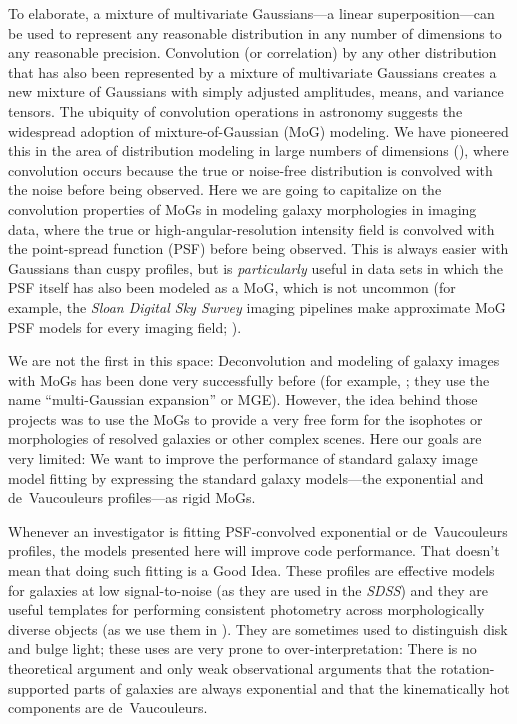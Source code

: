 \documentclass[12pt,pdftex,preprint]{aastex}
\newcommand{\project}[1]{\textsl{#1}}
\begin{document}
To elaborate, a mixture of multivariate Gaussians---a linear
superposition---can be used to represent any reasonable distribution
in any number of dimensions to any reasonable precision.  Convolution
(or correlation) by any other distribution that has also been
represented by a mixture of multivariate Gaussians creates a new
mixture of Gaussians with simply adjusted amplitudes, means, and
variance tensors.  The ubiquity of convolution operations in astronomy
suggests the widespread adoption of mixture-of-Gaussian (MoG)
modeling.  We have pioneered this in the area of distribution modeling
in large numbers of dimensions (\citealt{xd, xdqso, xdqsoz}), where
convolution occurs because the true or noise-free distribution is
convolved with the noise before being observed.  Here we are going to
capitalize on the convolution properties of MoGs in modeling galaxy
morphologies in imaging data, where the true or
high-angular-resolution intensity field is convolved with the
point-spread function (PSF) before being observed.  This is always
easier with Gaussians than cuspy profiles, but is \emph{particularly}
useful in data sets in which the PSF itself has also been modeled as a
MoG, which is not uncommon (for example, the \project{Sloan Digital
  Sky Survey} imaging pipelines make approximate MoG PSF models for
every imaging field; \citealt{lupton}).

We are not the first in this space: Deconvolution and modeling of
galaxy images with MoGs has been done very successfully before (for
example, \citealt{bendinelli, emsellem, bendinelli2, cappellari}; they
use the name ``multi-Gaussian expansion'' or MGE).  However, the idea
behind those projects was to use the MoGs to provide a very free form
for the isophotes or morphologies of resolved galaxies or other
complex scenes.  Here our goals are very limited: We want to improve
the performance of standard galaxy image model fitting by expressing
the standard galaxy models---the exponential and de~Vaucouleurs
profiles---as rigid MoGs.

Whenever an investigator is fitting PSF-convolved exponential or
de~Vaucouleurs profiles, the models presented here will improve code
performance.  That doesn't mean that doing such fitting is a Good
Idea.  These profiles are effective models for galaxies at low
signal-to-noise (as they are used in the \project{SDSS}) and they are
useful templates for performing consistent photometry across
morphologically diverse objects (as we use them in \citealt{bundy}).
They are sometimes used to distinguish disk and bulge light; these
uses are very prone to over-interpretation: There is no theoretical
argument and only weak observational arguments that the
rotation-supported parts of galaxies are always exponential and that
the kinematically hot components are de~Vaucouleurs.
\end{document}
